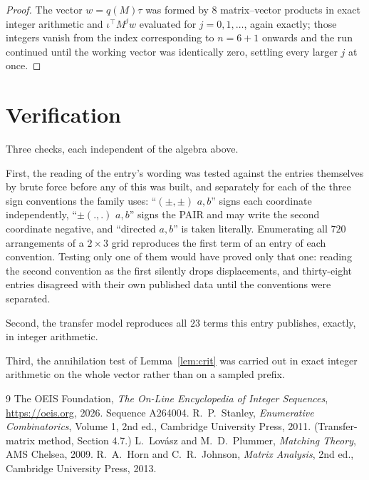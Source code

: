 \documentclass[11pt,a4paper]{article}
\theoremstyle{plain}
\theoremstyle{definition}
\begin{document}
\begin{proof}
The vector $w=q(M)\tau$ was formed by $8$ matrix--vector products in exact integer
arithmetic and $\iota^{\!\top}M^{j}w$ evaluated for $j=0,1,\dots$, again exactly; those
integers vanish from the index corresponding to $n=6+1$ onwards and the run continued
until the working vector was identically zero, settling every larger $j$ at once.
\end{proof}

\section{Verification}

Three checks, each independent of the algebra above.

First, the reading of the entry's wording was tested against the entries themselves by brute
force before any of this was built, and separately for each of the three sign conventions the
family uses: ``$(\pm,\pm)$ $a,b$'' signs each coordinate independently, ``$\pm(.,.)$ $a,b$''
signs the PAIR and may write the second coordinate negative, and ``directed $a,b$'' is taken
literally. Enumerating all $720$ arrangements of a $2\times3$ grid reproduces the first term
of an entry of each convention. Testing only one of them would have proved only that one:
reading the second convention as the first silently drops displacements, and thirty-eight
entries disagreed with their own published data until the conventions were separated.

Second, the transfer model reproduces all $23$ terms this entry publishes, exactly, in
integer arithmetic.

Third, the annihilation test of Lemma~\ref{lem:crit} was carried out in exact integer
arithmetic on the whole vector rather than on a sampled prefix.

\begin{thebibliography}{9}
 The OEIS Foundation, \emph{The On-Line Encyclopedia of Integer
Sequences}, \url{https://oeis.org}, 2026. Sequence A264004.
 R.~P.~Stanley, \emph{Enumerative Combinatorics}, Volume 1, 2nd ed.,
Cambridge University Press, 2011. (Transfer-matrix method, Section 4.7.)
 L.~Lov\'asz and M.~D.~Plummer, \emph{Matching Theory}, AMS Chelsea, 2009.
 R.~A.~Horn and C.~R.~Johnson, \emph{Matrix Analysis}, 2nd ed., Cambridge
University Press, 2013.
\end{thebibliography}
\end{document}
